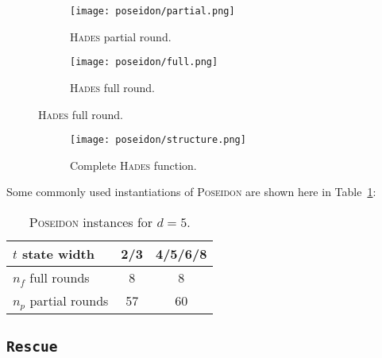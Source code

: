 \documentclass[12pt, a4paper]{report}
\begin{document}
\begin{figure}[H]
  \begin{center}
    \begin{subfigure}{0.40\textwidth}
      \texttt{[image: poseidon/partial.png]}
      \caption{\textsc{Hades} partial round.}\label{subfig:poseidonpartial}
    \end{subfigure}
    \hfill
    \begin{subfigure}{0.40\textwidth}
      \texttt{[image: poseidon/full.png]}
      \caption{\textsc{Hades} full round.}\label{subfig:poseidonfull}
    \end{subfigure}
  \end{center}
\end{figure}
\renewcommand\thesubfigure{c}
\begin{figure}[H]
  \begin{center}
    \begin{subfigure}{0.40\textwidth}
      \texttt{[image: poseidon/structure.png]}
      \caption{Complete \textsc{Hades} function.}\label{subfig:poseidonstructure}
    \end{subfigure}
  \end{center}
  \caption{}\label{fig:poseidon}
\end{figure}

Some commonly used instantiations of \textsc{Poseidon} are shown here in Table~\ref{tab:poseidoninstances}:
\begin{table}[H]
  \caption{\textsc{Poseidon} instances for $d=5$.}\label{tab:poseidoninstances}
  \begin{center}
    \begin{tabular}{|l|c|c|}
      \hline
      $t$ state width & 2/3 & 4/5/6/8 \\
      \hline
      $n_f$ full rounds & 8 & 8 \\
      \hline
      $n_p$ partial rounds & 57 & 60 \\
      \hline
    \end{tabular}
  \end{center}
\end{table}

\subsection{\texttt{Rescue}}\label{subsec:rescue}
\end{document}

